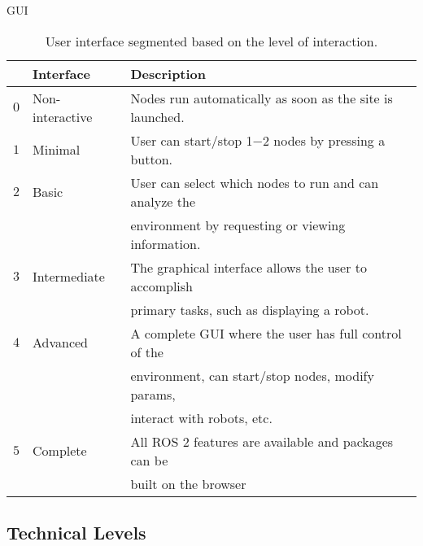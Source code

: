         \ac{GUI}

        \begin{table}[htbp]
            \color{textColor}
            \centering	
            \caption{User interface segmented based on the level of interaction.}
                \begin{tabular}{rll}
                    \toprule
                    & \textbf{Interface} & \textbf{Description} \\
                    \midrule
                    $0$ & Non-interactive & Nodes run automatically as soon as the site is launched. \\ [0.5em]

                    $1$ & Minimal         & User can start/stop 1$-$2 nodes by pressing a button. \\[0.5em]

                    $2$ & Basic           & User can select which nodes to run and can analyze the \\
                    & & environment by requesting or viewing information. \\[0.5em]

                    $3$ & Intermediate    & The graphical interface allows the user to accomplish \\
                    & & primary tasks, such as displaying a robot. \\[0.5em]

                    $4$ & Advanced        & A complete GUI where the user has full control of the \\
                    & & environment, can start/stop nodes, modify params, \\
                    & & interact with robots, etc. \\[0.5em]

                    $5$ & Complete        & All ROS 2 features are available and packages can be \\
                    & & built on the browser \\

                \bottomrule
            \end{tabular}\label{tab:uilevels}
        \end{table}

    \subsection{Technical Levels}

